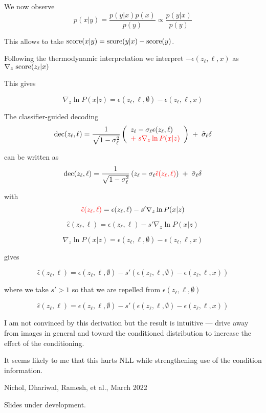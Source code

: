 {

We now observe
$$p(x|y) = \frac{p(y|x)p(x)}{p(y)} \propto \frac{p(y|x)}{p(y)}$$

\vfill
This allows to take $\mathrm{score}(x|y) = \mathrm{score}(y|x) - \mathrm{score}(y)$.

\vfill
Following the thermodynamic interpretation we interpret $- \epsilon(z_\ell,\ell,x)$ as $\nabla_z\; \mathrm{score}(z_\ell|x)$

\vfill
This gives

$$\nabla_z \ln P(x|z) = \epsilon(z_\ell,\ell,\emptyset) - \epsilon(z_\ell,\ell,x)$$



The classifier-guided decoding
$$\mathrm{dec}(z_\ell,\ell) = \frac{1}{\sqrt{1-\sigma_\ell^2}}\left(
\begin{array}{l}z_\ell - \sigma_\ell \epsilon(z_\ell,\ell) \\
  {\color{red} +  \; s \nabla_{z} \ln P(x|z)}\end{array}\right)\; +\; \tilde{\sigma}_\ell\delta$$

can be written as
$$\mathrm{dec}(z_\ell,\ell) = \frac{1}{\sqrt{1-\sigma_\ell^2}}\left(z_\ell - \sigma_\ell {\color{red} \hat{\epsilon}(z_\ell,\ell)}\right)\; +\; \tilde{\sigma}_\ell\delta$$

with
$${\color{red} \hat{\epsilon}(z_\ell,\ell)} = \epsilon(z_\ell,\ell) - s'\nabla_z \ln P(x|z)$$

$$\hat{\epsilon}(z_\ell,\ell) = \epsilon(z_\ell,\ell) - s'\nabla_z \ln P(x|z)$$

$$\nabla_z \ln P(x|z) = \epsilon(z_\ell,\ell,\emptyset) - \epsilon(z_\ell,\ell,x)$$

gives

$$\hat{\epsilon}(z_\ell,\ell) = \epsilon(z_\ell,\ell,\emptyset) - s'(\epsilon(z_\ell,\ell,\emptyset) - \epsilon(z_\ell,\ell,x))$$

\vfill
where we take $s' > 1$ so that we are repelled from $\epsilon(z_\ell,\ell,\emptyset)$


$$\hat{\epsilon}(z_\ell,\ell) = \epsilon(z_\ell,\ell,\emptyset) - s'(\epsilon(z_\ell,\ell,\emptyset) - \epsilon(z_\ell,\ell,x))$$

\vfill
I am not convinced by this derivation but the result is intuitive --- drive away from images in general and toward the conditioned distribution to increase the effect of the conditioning.

\vfill
It seems likely to me that this hurts NLL while strengthening use of the condition information.

         {Nichol, Dhariwal, Ramesh, et al., March 2022}

Slides under development.


}

